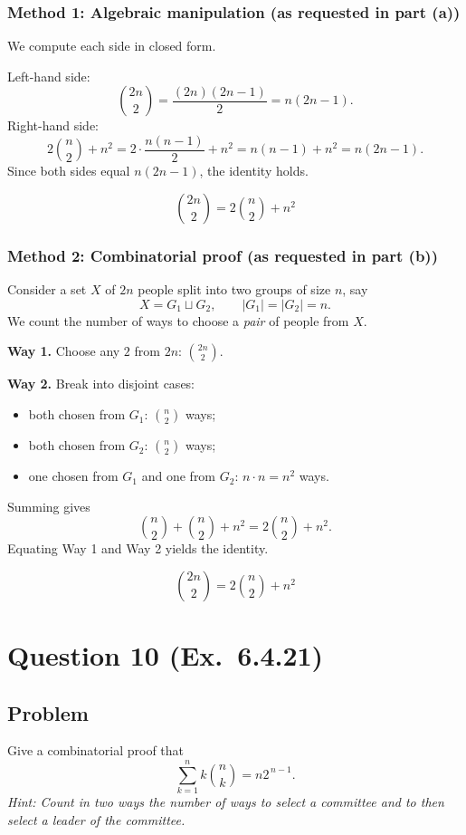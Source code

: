 \documentclass[12pt]{article}
\begin{document}
\subsubsection{Method 1: Algebraic manipulation (as requested in part (a))}
We compute each side in closed form.

Left-hand side:
\[
\binom{2n}{2}=\frac{(2n)(2n-1)}{2}=n(2n-1).
\]
Right-hand side:
\[
2\binom{n}{2}+n^2
=2\cdot \frac{n(n-1)}{2}+n^2
=n(n-1)+n^2
=n(2n-1).
\]
Since both sides equal $n(2n-1)$, the identity holds.

\[
\boxed{\binom{2n}{2}=2\binom{n}{2}+n^{2}}
\]

\subsubsection{Method 2: Combinatorial proof (as requested in part (b))}
Consider a set $X$ of $2n$ people split into two groups of size $n$, say
\[
X=G_1\sqcup G_2,\qquad |G_1|=|G_2|=n.
\]
We count the number of ways to choose a \emph{pair} of people from $X$.

\medskip
\noindent\textbf{Way 1.} Choose any $2$ from $2n$: $\binom{2n}{2}$.

\medskip
\noindent\textbf{Way 2.} Break into disjoint cases:
\begin{itemize}[leftmargin=*]
\item both chosen from $G_1$: $\binom{n}{2}$ ways;
\item both chosen from $G_2$: $\binom{n}{2}$ ways;
\item one chosen from $G_1$ and one from $G_2$: $n\cdot n=n^2$ ways.
\end{itemize}
Summing gives
\[
\binom{n}{2}+\binom{n}{2}+n^2=2\binom{n}{2}+n^2.
\]
Equating Way 1 and Way 2 yields the identity.

\[
\boxed{\binom{2n}{2}=2\binom{n}{2}+n^{2}}
\]

\newpage

\section{Question 10 (Ex.\ 6.4.21)}
\subsection{Problem}
Give a combinatorial proof that
\[
\sum_{k=1}^{n} k\binom{n}{k}=n2^{\,n-1}.
\]
\emph{Hint: Count in two ways the number of ways to select a committee and to then select a leader of the committee.}
\end{document}
